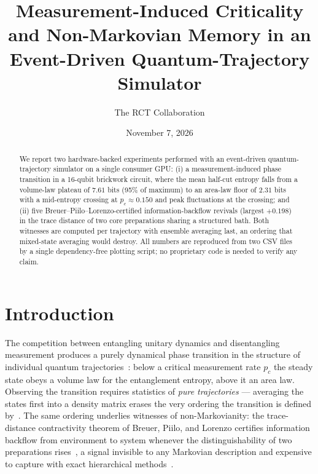 \documentclass[aps,pra,preprint,superscriptaddress]{revtex4-2}
\begin{document}
\title{Measurement-Induced Criticality and Non-Markovian Memory in an
Event-Driven Quantum-Trajectory Simulator}

\author{The RCT Collaboration}
\date{November 7, 2026}

\begin{abstract}
We report two hardware-backed experiments performed with an event-driven
quantum-trajectory simulator on a single consumer GPU: (i) a
measurement-induced phase transition in a 16-qubit brickwork circuit, where
the mean half-cut entropy falls from a volume-law plateau of $7.61$ bits
(95\% of maximum) to an area-law floor of $2.31$ bits with a mid-entropy
crossing at $p_c \approx 0.150$ and peak fluctuations at the crossing; and
(ii) five Breuer--Piilo--Lorenzo-certified information-backflow revivals
(largest $+0.198$) in the trace distance of two core preparations sharing a
structured bath.  Both witnesses are computed per trajectory with ensemble
averaging last, an ordering that mixed-state averaging would destroy.  All
numbers are reproduced from two CSV files by a single dependency-free
plotting script; no proprietary code is needed to verify any claim.
\end{abstract}

\maketitle

\section{Introduction}

The competition between entangling unitary dynamics and disentangling
measurement produces a purely dynamical phase transition in the structure of
individual quantum trajectories~\cite{LiChenFisher2018,LiChenFisher2019,
SkinnerRuhmanNahum2019,ChanNandkishore2019,Choi2020,FisherReview2023}: below
a critical measurement rate $p_c$ the steady state obeys a volume law for the
entanglement entropy, above it an area law.  Observing the transition requires
statistics of \emph{pure trajectories} --- averaging the states first into a
density matrix erases the very ordering the transition is defined
by~\cite{FisherReview2023}.  The same ordering underlies witnesses of
non-Markovianity: the trace-distance contractivity theorem of
Breuer, Piilo, and Lorenzo certifies information backflow from environment to
system whenever the distinguishability of two preparations
rises~\cite{BLP2009,RivasHuelgaPlenio2014,deVegaAlonso2017}, a signal invisible
to any Markovian description and expensive to capture with exact hierarchical
methods~\cite{TanimuraKubo1989,Strathearn2018}.
\end{document}
